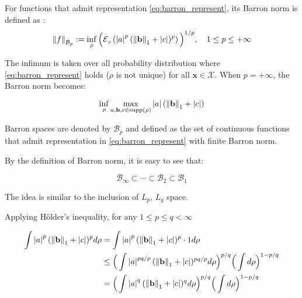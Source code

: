 \begin{definition} For functions that admit representation \eqref{eq:barron_represent}, its Barron norm is defined as \cite{eBarronSpaceFlowinduced2021}: 
    \begin{equation}\label{eq:barron_norm}
        \barronnorm{f}{p} := \inf_{\rho} \Big(\ERWi{\rho}{\abs{a}^p (\norm{\mathbf{b}}_1 + \abs{c})^p}\Big)^{1/p}, \quad 1 \leq p \leq +\infty
    \end{equation}
\end{definition}

The infimum is taken over all probability distribution where \eqref{eq:barron_represent} holds ($\rho$ is not unique) for all
$\mathbf{x} \in \mathcal{X}$. When $p = + \infty$, the Barron norm becomes:

\begin{equation}
    \inf_{\rho} \max_{a, \mathbf{b}, c \in \operatorname{supp}(\rho)} \left| a \right| (\left\| \mathbf{b} \right\|_1 + \left| c \right|)
\end{equation}

Barron spaces are denoted by $\mathcal{B}_p$ and defined as the set of \textit{}{continuous} functions
that admit representation in \eqref{eq:barron_represent} with finite Barron norm.

By the definition of Barron norm, it is easy to see that:

\begin{equation}
    \mathcal{B}_{\infty} \subset \cdots \subset \mathcal{B}_{2} \subset \mathcal{B}_1
\end{equation}



The idea is similar to the inclusion of $L_p$, $L_q$ space.

    Applying Hölder's inequality, for any $1 \leq p \leq q < \infty$

    \begin{align*}
        \int \left| a \right|^p (\left\| \mathbf{b} \right\|_1 + \left| c \right|)^p d\rho
        &= \int \left| a \right|^p (\left\| \mathbf{b} \right\|_1 + \left| c \right|)^p \cdot 1 d\rho \\
        &\leq \Big(\int \left| a \right|^{pq/p} (\left\| \mathbf{b} \right\|_1 + \left| c \right|)^{pq/p} d\rho \Big)^{p/q} \Big(\int d\rho\Big)^{1-p/q} \\
        &= \Big(\int \left| a \right|^q (\left\| \mathbf{b} \right\|_1 + \left| c \right|)^q d\rho \Big)^{p/q} \Big(\int d\rho\Big)^{1-p/q} 
    \end{align*}


